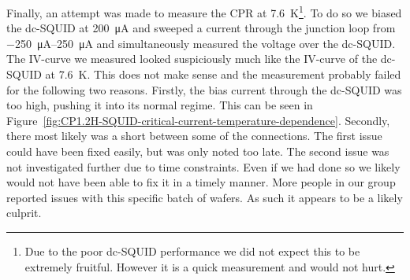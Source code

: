 Finally, an attempt was made to measure the CPR at \qty{7.6}{\kelvin}\footnote{Due to the poor dc-SQUID performance we did not expect this to be extremely fruitful. However it is a quick measurement and would not hurt.}. To do so we biased the dc-SQUID at \qty{200}{\micro\ampere} and sweeped a current through the junction loop from \qtyrange{-250}{250}{\micro\ampere} and simultaneously measured the voltage over the dc-SQUID. The IV-curve we measured looked suspiciously much like the IV-curve of the dc-SQUID at \qty{7.6}{\kelvin}. This does not make sense and the measurement probably failed for the following two reasons. Firstly, the bias current through the dc-SQUID was too high, pushing it into its normal regime. This can be seen in Figure~\ref{fig:CP1.2H-SQUID-critical-current-temperature-dependence}. Secondly, there most likely was a short between some of the connections. The first issue could have been fixed easily, but was only noted too late. The second issue was not investigated further due to time constraints. Even if we had done so we likely would not have been able to fix it in a timely manner. More people in our group reported issues with this specific batch of  wafers. As such it appears to be a likely culprit.